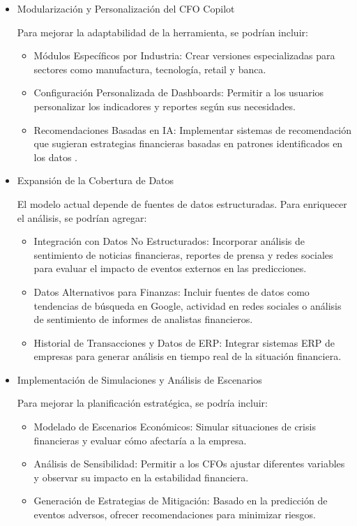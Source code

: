 \documentclass[12pt,letterpaper,oneside]{report}
\renewcommand{\_}{\UnderscoreOriginal\allowbreak}
\begin{document}
\begin{itemize}
\item Modularización y Personalización del CFO Copilot

Para mejorar la adaptabilidad de la herramienta, se podrían incluir:

\begin{itemize}
\item Módulos Específicos por Industria: Crear versiones especializadas para sectores como manufactura, tecnología, retail y banca.
\item Configuración Personalizada de Dashboards: Permitir a los usuarios personalizar los indicadores y reportes según sus necesidades.
\item Recomendaciones Basadas en IA: Implementar sistemas de recomendación que sugieran estrategias financieras basadas en patrones identificados en los datos \parencite{Lamas2015}.
\end{itemize}

\item Expansión de la Cobertura de Datos

El modelo actual depende de fuentes de datos estructuradas. Para enriquecer el análisis, se podrían agregar:

\begin{itemize}
\item Integración con Datos No Estructurados: Incorporar análisis de sentimiento de noticias financieras, reportes de prensa y redes sociales para evaluar el impacto de eventos externos en las predicciones.
\item Datos Alternativos para Finanzas: Incluir fuentes de datos como tendencias de búsqueda en Google, actividad en redes sociales o análisis de sentimiento de informes de analistas financieros.
\item Historial de Transacciones y Datos de ERP: Integrar sistemas ERP de empresas para generar análisis en tiempo real de la situación financiera.
\end{itemize}

\item Implementación de Simulaciones y Análisis de Escenarios

Para mejorar la planificación estratégica, se podría incluir:
\begin{itemize}
\item Modelado de Escenarios Económicos: Simular situaciones de crisis financieras y evaluar cómo afectaría a la empresa.
\item Análisis de Sensibilidad: Permitir a los CFOs ajustar diferentes variables y observar su impacto en la estabilidad financiera.
\item Generación de Estrategias de Mitigación: Basado en la predicción de eventos adversos, ofrecer recomendaciones para minimizar riesgos.
\end{itemize}


\end{itemize}
\end{document}
